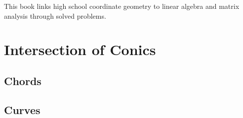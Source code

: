 \documentclass[11pt]{book}
\begin{document}

\setcounter{page}{1}

\begin{introduction}
This book links high school coordinate geometry to linear algebra and matrix analysis through solved problems.

\end{introduction}

\mainmatter
\chapter{Intersection of Conics}
\section{Chords}

\section{Curves}

\end{document}
